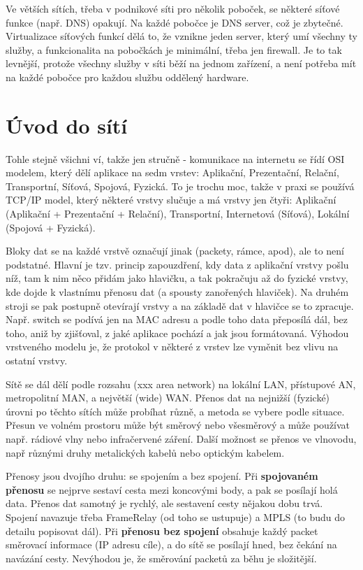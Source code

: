 Ve větších sítích, třeba v podnikové síti pro několik poboček, se některé síťové funkce (např. DNS) opakují. Na každé pobočce je DNS server, což je zbytečné. Virtualizace síťových funkcí dělá to, že vznikne jeden server, který umí všechny ty služby, a funkcionalita na pobočkách je minimální, třeba jen firewall. Je to tak levnější, protože všechny služby v síti běží na jednom zařízení, a není potřeba mít na každé pobočce pro každou službu oddělený hardware.



\section{Úvod do sítí}

Tohle stejně všichni ví, takže jen stručně - komunikace na internetu se řídí OSI modelem, který dělí aplikace na sedm vrstev: Aplikační, Prezentační, Relační, Transportní, Síťová, Spojová, Fyzická. To je trochu moc, takže v praxi se používá TCP/IP model, který některé vrstvy slučuje a má vrstvy jen čtyři: Aplikační (Aplikační + Prezentační + Relační), Transportní, Internetová (Síťová), Lokální (Spojová + Fyzická).

Bloky dat se na každé vrstvě označují jinak (packety, rámce, apod), ale to není podstatné. Hlavní je tzv. princip zapouzdření, kdy data z aplikační vrstvy pošlu níž, tam k nim něco přidám jako hlavičku, a tak pokračuju až do fyzické vrstvy, kde dojde k vlastnímu přenosu dat (a spousty zanořených hlaviček). Na druhém stroji se pak postupně otevírají vrstvy a na základě dat v hlavičce se to zpracuje. Např. switch se podívá jen na MAC adresu a podle toho data přeposílá dál, bez toho, aniž by zjišťoval, z jaké aplikace pochází a jak jsou formátovaná. Výhodou vrstveného modelu je, že protokol v některé z vrstev lze vyměnit bez vlivu na ostatní vrstvy.

Sítě se dál dělí podle rozsahu (xxx area network) na lokální LAN, přístupové AN, metropolitní MAN, a největší (wide) WAN. Přenos dat na nejnižší (fyzické) úrovni po těchto sítích může probíhat různě, a metoda se vybere podle situace. Přesun ve volném prostoru může být směrový nebo všesměrový a může používat např. rádiové vlny nebo infračervené záření. Další možnost se přenos ve vlnovodu, např různými druhy metalických kabelů nebo optickým kabelem.

Přenosy jsou dvojího druhu: se spojením a bez spojení. Při \textbf{spojovaném přenosu} se nejprve sestaví cesta mezi koncovými body, a pak se posílají holá data. Přenos dat samotný je rychlý, ale sestavení cesty nějakou dobu trvá. Spojení navazuje třeba FrameRelay (od toho se ustupuje) a MPLS   (to budu do detailu popisovat dál). Při \textbf{přenosu bez spojení} obsahuje každý packet směrovací informace (IP adresu cíle), a do sítě se posílají hned, bez čekání na navázání cesty. Nevýhodou je, že směrování packetů za běhu je složitější.

